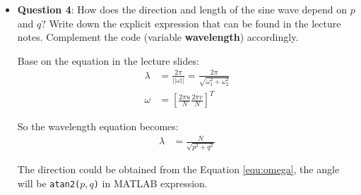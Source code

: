 \documentclass[11pt,a4paper]{article}
\begin{document}
\begin{itemize}
	\item \textbf{Question 4}: How does the direction and length of the sine wave depend on $p$ and $q$? Write down the explicit expression that can be found in the lecture notes. Complement the code (variable \textbf{wavelength}) accordingly.
	\par Base on the equation in the lecture slides:
	\begin{align}
		\lambda &= \frac{2\pi}{||\omega||} = \frac{2\pi}{\sqrt{\omega_{1}^{2}+\omega_{2}^{2}}} \\
		\omega &= \left[ \frac{2\pi u}{N} \frac{2\pi v}{N} \right]^{T} \label{equ:omega}
	\end{align}
	\par So the wavelength equation becomes:
	\begin{align}
		\lambda &= \frac{N}{\sqrt{p^{2}+q^{2}}} \label{equ:wavelength}
	\end{align}
	\par The direction could be obtained from the Equation \ref{equ:omega}, the angle will be \texttt{atan2($p, q$)} in MATLAB expression.


\end{itemize}
\end{document}

